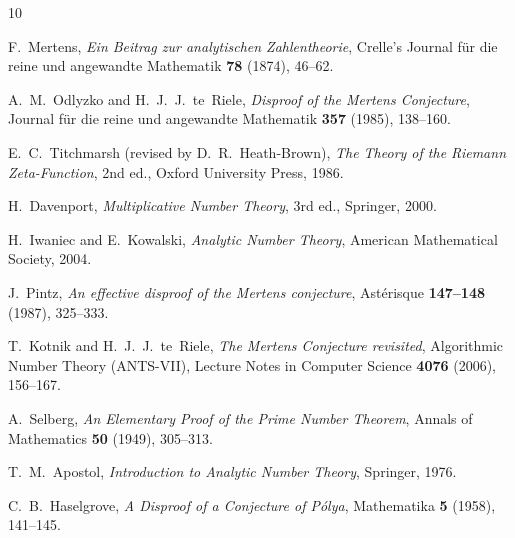 \documentclass[12pt,a4paper]{amsart}
\theoremstyle{definition}
\begin{document}
\begin{thebibliography}{10}

F.~Mertens,
\textit{Ein Beitrag zur analytischen Zahlentheorie},
Crelle's Journal für die reine und angewandte Mathematik \textbf{78} (1874),
46--62.

A.~M.~Odlyzko and H.~J.~J.~te~Riele,
\textit{Disproof of the Mertens Conjecture},
Journal für die reine und angewandte Mathematik \textbf{357} (1985), 138--160.

E.~C.~Titchmarsh (revised by D.~R.~Heath-Brown),
\textit{The Theory of the Riemann Zeta-Function},
2nd ed., Oxford University Press, 1986.

H.~Davenport,
\textit{Multiplicative Number Theory},
3rd ed., Springer, 2000.

H.~Iwaniec and E.~Kowalski,
\textit{Analytic Number Theory},
American Mathematical Society, 2004.

J.~Pintz,
\textit{An effective disproof of the Mertens conjecture},
Astérisque \textbf{147--148} (1987), 325--333.

T.~Kotnik and H.~J.~J.~te~Riele,
\textit{The Mertens Conjecture revisited},
Algorithmic Number Theory (ANTS-VII), Lecture Notes in Computer Science
\textbf{4076} (2006), 156--167.

A.~Selberg,
\textit{An Elementary Proof of the Prime Number Theorem},
Annals of Mathematics \textbf{50} (1949), 305--313.

T.~M.~Apostol,
\textit{Introduction to Analytic Number Theory},
Springer, 1976.

C.~B.~Haselgrove,
\textit{A Disproof of a Conjecture of Pólya},
Mathematika \textbf{5} (1958), 141--145.

\end{thebibliography}
\end{document}
